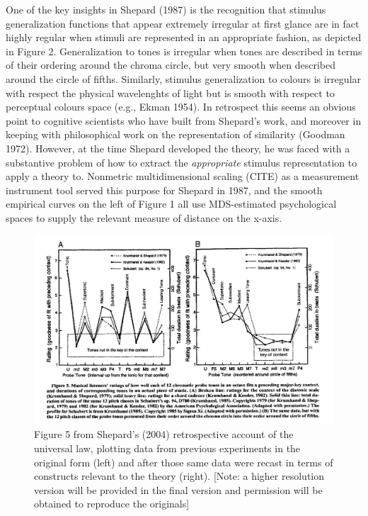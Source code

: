 \documentclass[english,doc]{apa6}
\begin{document}
One of the key insights in Shepard (1987) is the recognition that stimulus generalization functions that appear extremely irregular at first glance are in fact highly regular when stimuli are represented in an appropriate fashion, as depicted in Figure 2. Generalization to tones is irregular when tones are described in terms of their ordering around the chroma circle, but very smooth when described around the circle of fifths. Similarly, stimulus generalization to colours is irregular with respect the physical wavelenghts of light but is smooth with respect to perceptual colours space (e.g., Ekman 1954). In retrospect this seems an obvious point to cognitive scientists who have built from Shepard's work, and moreover in keeping with philosophical work on the representation of similarity (Goodman 1972). However, at the time Shepard developed the theory, he was faced with a substantive problem of how to extract the \emph{appropriate} stimulus representation to apply a theory to. Nonmetric multidimensional scaling (CITE) as a measurement instrument tool served this purpose for Shepard in 1987, and the smooth empirical curves on the left of Figure 1 all use MDS-estimated psychological spaces to supply the relevant measure of distance on the x-axis.



\begin{figure}[t]
\includegraphics[width=5.71in]{shepard2} \caption{Figure 5 from Shepard's (2004) retrospective account of the universal law, plotting data from previous experiments in the original form (left) and after those same data were recast in terms of constructs relevant to the theory (right). {[}Note: a higher resolution version will be provided in the final version and permission will be obtained to reproduce the originals{]}}\label{fig:unnamed-chunk-2}
\end{figure}
\end{document}
